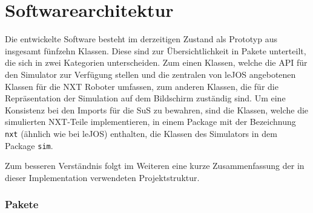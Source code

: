 \documentclass[paper=a4, DIV=calc, BCOR=12mm, twoside=on, onecolumn=on, open = right, titlepage =on, parskip =half-, headsepline = on, footsepline = off, chapterprefix = off, appendixprefix = on, fontsize = 12pt, numbers = noenddot, abstract = on]{scrbook}
\begin{document}
\par \singlespacing
\section{Softwarearchitektur}
\onehalfspacing 

Die entwickelte Software besteht im derzeitigen Zustand als Prototyp aus insgesamt fünfzehn Klassen. Diese sind zur Übersichtlichkeit in Pakete unterteilt, die sich in zwei Kategorien unterscheiden. Zum einen Klassen, welche die API für den Simulator zur Verfügung stellen und die zentralen von leJOS angebotenen Klassen für die NXT Roboter umfassen, zum anderen Klassen, die für die Repräsentation der Simulation auf dem Bildschirm zuständig sind. Um eine Konsistenz bei den Imports für die SuS zu bewahren, sind die Klassen, welche die simulierten NXT-Teile implementieren, in einem Package mit der Bezeichnung \texttt{nxt} (ähnlich wie bei leJOS) enthalten, die Klassen des Simulators in dem Package \texttt{sim}. 

Zum besseren Verständnis folgt im Weiteren eine kurze Zusammenfassung der in dieser Implementation verwendeten Projektstruktur.


\subsubsection*{Pakete}
\end{document}
